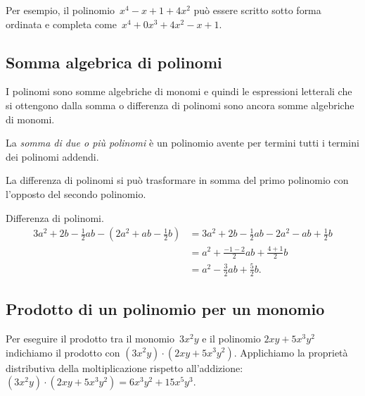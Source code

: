 Per esempio, il polinomio~$x^4-x+1+4x^2$ può essere scritto sotto forma ordinata e completa come~$x^4+0x^3+4x^2-x+1$.


\subsection{Somma algebrica di polinomi}
\label{subsec:10_poli_somma}

I polinomi sono somme algebriche di monomi e quindi le espressioni letterali che si ottengono dalla somma
o differenza di polinomi sono ancora somme algebriche di monomi.

\begin{definizione}
La \emph{somma di due o più polinomi} è un polinomio avente per termini tutti i termini dei polinomi addendi.
\end{definizione}

La differenza di polinomi si può trasformare in somma del primo polinomio con l'opposto del secondo polinomio.

\begin{exrig}
\begin{esempio}
Differenza di polinomi.
\begin{equation*}
\begin{split}
3a^2+2b-\frac{1}{2}ab-\left(2a^2+ab-\frac{1}{2}b\right)&=3a^2+2b-\frac{1}{2}ab-2a^2-ab+\frac{1}{2}b\\
&=a^2+\frac{-1-2}{2}ab+\frac{4+1}{2}b\\
&=a^2-\frac{3}{2}ab+\frac{5}{2}b.
\end{split}
\end{equation*}
\end{esempio}
\end{exrig}


\subsection{Prodotto di un polinomio per un monomio}
\label{subsec:10_poli_prodottopermonomio}

Per eseguire il prodotto tra il monomio~$3x^{2}y$ e il polinomio
$2{xy}+5x^{3}y^{2}$ indichiamo il prodotto con
$\left(3x^{2}y\right)\cdot \left(2{xy}+5x^{3}y^{2}\right)$.
Applichiamo la proprietà distributiva della moltiplicazione rispetto
all'addizione:~$\left(3x^{2}y\right)\cdot
\left(2{xy}+5x^{3}y^{2}\right)=6x^{3}y^{2}+15x^{5}y^{3}$.

